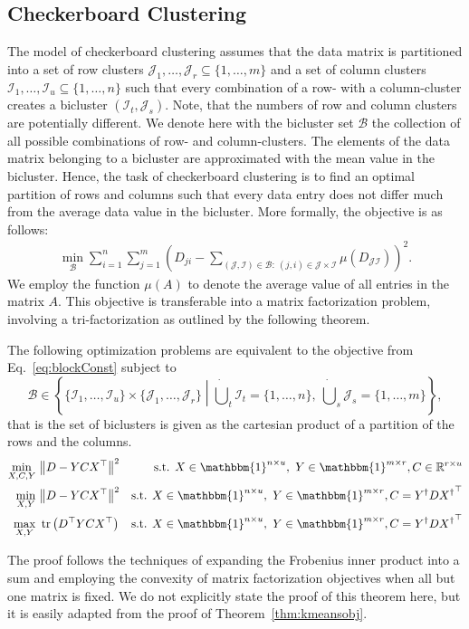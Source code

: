 \subsection{Checkerboard Clustering}
The model of checkerboard clustering assumes that the data matrix is partitioned into a set of row clusters $\mathcal{J}_1,\ldots,\mathcal{J}_r\subseteq\{1,\ldots,m\}$ and a set of column clusters $\mathcal{I}_1,\ldots,\mathcal{I}_{u}\subseteq\{1,\ldots,n\}$ such that every combination of a row- with a column-cluster creates a bicluster $(\mathcal{I}_t,\mathcal{J}_s)$. Note, that the numbers of row and column clusters are potentially different. We denote here with the bicluster set $\mathcal{B}$ the collection of all possible combinations of row- and column-clusters. 
The elements of the data matrix belonging to a bicluster are approximated with the mean value in the bicluster. Hence, the task of checkerboard clustering is to find an optimal partition of rows and columns such that every data entry does not differ much from the average data value in the bicluster. More formally, the objective is as follows:
\begin{align}
   \min_{\mathcal{B}} \sum_{i=1}^n\sum_{j=1}^m \left(D_{ji}-\sum_{ (\mathcal{J},\mathcal{I})\in\mathcal{B}:\  (j,i)\in\mathcal{J}\times\mathcal{I}}\mu(D_{\mathcal{JI}})\right)^2. \label{eq:blockConst}
\end{align}
We employ the function $\mu(A)$ to denote the average value of all entries in the matrix $A$.
This objective is transferable into a matrix factorization problem, involving a tri-fac\-tor\-iza\-tion as outlined by the following theorem.
\begin{theorem}\label{thm:checkerboard}
The following optimization problems are equivalent to the objective from Eq.~\eqref{eq:blockConst} subject to
\[\mathcal{B}\in \left\{\{\mathcal{I}_1,\ldots,\mathcal{I}_u\}\times \{\mathcal{J}_1,\ldots,\mathcal{J}_r\}\middle\vert \dot\bigcup_{t}\mathcal{I}_t=\{1,\ldots,n\},\  \dot\bigcup_{s}\mathcal{J}_s=\{1,\ldots,m\}\right\},\]
that is the set of biclusters is given as the cartesian product of a partition of the rows and the columns.
\begin{align}
    \label{eq:checkerOrig}
    \min_{X,C,Y}&\ \bigl\lVert D-YCX^\top\bigr\rVert ^2 &
    \text{s.t. } X\in \mathbbm{1}^{n\times u},\ Y\in\mathbbm{1}^{m\times r}, C\in\mathbb{R}^{r\times u}\\ 
    \label{eq:checkerAvg}
\min_{X,Y}&\ \bigl\lVert D-YCX^\top\bigr\rVert ^2&
\text{s.t. } X\in \mathbbm{1}^{n\times u},\ Y\in\mathbbm{1}^{m\times r}, C= Y^\dagger D {X^\dagger}^\top\\
\max_{X,Y}&\ \tr\left(D^\top YCX^\top\right) &
\text{s.t. } X\in \mathbbm{1}^{n\times u},\ Y\in\mathbbm{1}^{m\times r}, C= Y^\dagger D {X^\dagger}^\top
\end{align}
\end{theorem}
The proof follows the techniques of expanding the Frobenius inner product into a sum and employing the convexity of matrix factorization objectives when all but one matrix is fixed. We do not explicitly state the proof of this theorem here, but it is easily adapted from the proof of Theorem~\ref{thm:kmeansobj}.

